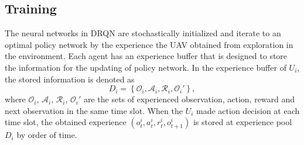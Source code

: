 \documentclass[journal]{IEEEtran}
\begin{document}
%
%
\subsection{Training}\label{training}

The neural networks in DRQN are stochastically initialized and iterate to an optimal policy network by the experience the UAV obtained from exploration in the environment. Each agent has an experience buffer that is designed to store the information for the updating of policy network. In the experience buffer of $U_i$, the stored information is denoted as 
\begin{equation}\label{exp_pool}
D_i=\left\{\mathcal{O}_i, \mathcal{A}_i, \mathcal{R}_i, \mathcal{O}_i'\right\}, 
\end{equation}
where $\mathcal{O}_i$, $\mathcal{A}_i$, $\mathcal{R}_i$, $\mathcal{O}_i'$ are the sets of experienced observation, action, reward and next observation in the same time slot. When the $U_i$ made action decision at each time slot, the obtained experience $\left({o^i_t, a^i_t, r^i_t, o^i_{t+1}}\right)$ is stored at experience pool $D_i$ by order of time. 
\end{document}
